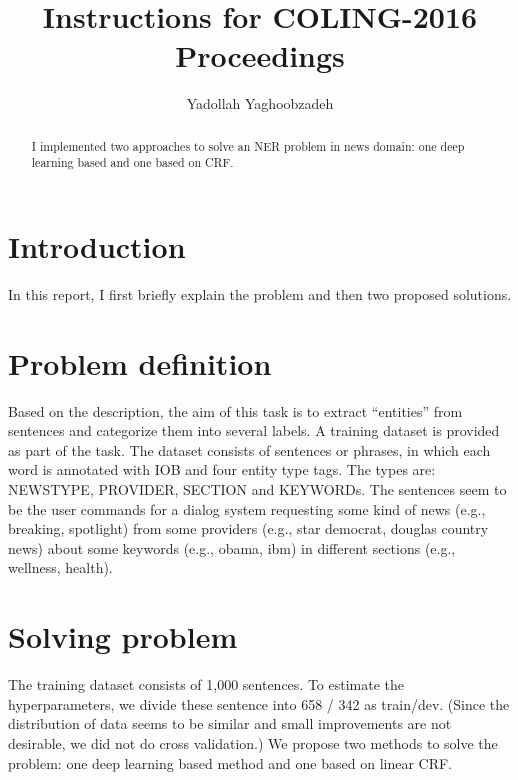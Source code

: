 \documentclass[11pt]{article}
\title{Instructions for COLING-2016 Proceedings}
\author{Yadollah Yaghoobzadeh}
\date{}
\begin{document}
\maketitle


\begin{abstract}
I implemented two approaches to solve an NER problem in news domain:
one deep learning based and one based on CRF. 

\end{abstract}
%
\section{Introduction}
In this report, I first briefly explain the problem and then 
two proposed solutions. 


\section{Problem definition}

Based on the description, the aim of this task is to extract ``entities'' from 
sentences and categorize them into several labels.
A  training dataset is provided as part of the task. 
The dataset consists of sentences or phrases, 
in which each word is annotated with IOB and four entity type tags. 
The types are: 
NEWSTYPE, PROVIDER, SECTION and KEYWORDs.
The sentences seem to be the user commands for a dialog system
requesting some kind of news (e.g., breaking, spotlight) 
from some providers (e.g., star democrat, douglas country news) 
about some keywords (e.g., obama, ibm) 
in different sections 
(e.g., wellness, health).


\section{Solving problem}
The training dataset consists of 1,000 sentences.
To estimate the hyperparameters, we divide
these sentence into 658 / 342 as train/dev.
(Since the distribution of data seems to be similar and small improvements
are not desirable, we did not do cross validation.)
We propose two methods to solve the problem:
one deep learning based method and one 
based on linear CRF. 
\end{document}
